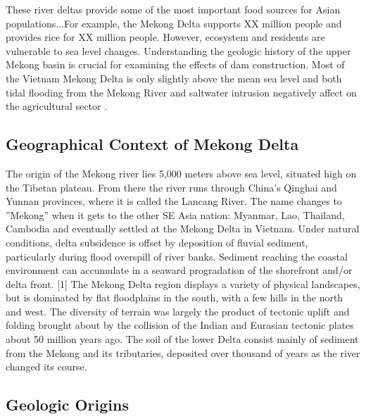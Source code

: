 These river deltas provide some of the most important food sources for Asian populations...For example, the Mekong Delta supports XX million people and provides rice for XX million people. However, ecosystem and residents are vulnerable to sea level changes. Understanding the geologic history of the upper Mekong basin is crucial for examining the effects of dam construction. Most of the Vietnam Mekong Delta is only slightly above the mean sea level and both tidal flooding from the Mekong River and saltwater intrusion negatively affect on the agricultural sector \citep{wassmann2004sea}.

\subsection{Geographical Context of Mekong Delta}

  The origin of the Mekong river lies 5,000 meters above sea level, situated high on the Tibetan plateau. From there the river runs through China's Qinghai and Yunnan provinces, where it is called the Lancang River. The name changes to ''Mekong'' when it gets to the other SE Asia nation: Myanmar, Lao, Thailand, Cambodia and eventually settled at the Mekong Delta in Vietnam. Under natural conditions, delta subsidence is offset by deposition of fluvial sediment, particularly during flood overspill of river banks. Sediment reaching the coastal environment can accumulate in a seaward progradation of the shorefront and/or delta front. [1] The Mekong Delta region displays a variety of physical landscapes, but is dominated by flat floodplains in the south, with a few hills in the north and west. The diversity of terrain was largely the product of tectonic uplift and folding brought about by the collision of the Indian and Eurasian tectonic plates about 50 million years ago. The soil of the lower Delta consist mainly of sediment from the Mekong and its tributaries, deposited over thousand of years as the river changed its course.
	
\subsection{Geologic Origins}


